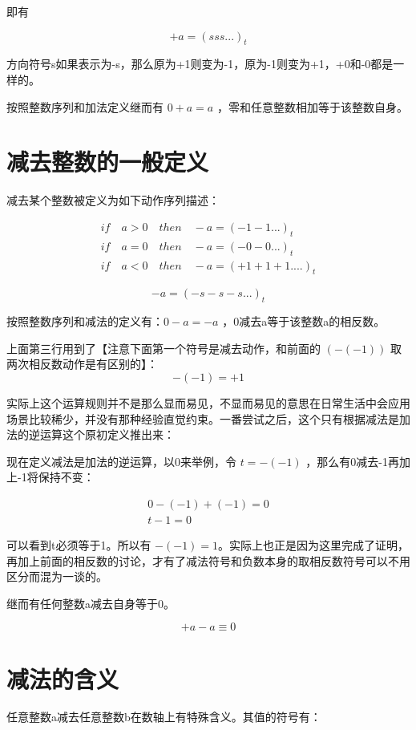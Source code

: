 \documentclass[12pt,oneside]{book}
\begin{document}
即有

\[
+a = (sss...)_t
\]

方向符号s如果表示为-s，那么原为+1则变为-1，原为-1则变为+1，+0和-0都是一样的。

按照整数序列和加法定义继而有 $0+a = a$ ，零和任意整数相加等于该整数自身。


\section{减去整数的一般定义}
减去某个整数被定义为如下动作序列描述：

\begin{align*}
if \quad a>0 \quad then \quad -a=(-1-1...)_t\\
if \quad a=0 \quad then \quad -a=(-0-0...)_t\\
if \quad a<0 \quad then \quad -a=(+1+1+1....)_t
\end{align*}

\[
-a = (-s-s-s...)_t
\]

按照整数序列和减法的定义有：$0-a=-a$  ，0减去a等于该整数a的相反数。

上面第三行用到了【注意下面第一个符号是减去动作，和前面的 $(-(-1))$ 取两次相反数动作是有区别的】：
\begin{equation}
-(-1) = +1
\end{equation}

实际上这个运算规则并不是那么显而易见，不显而易见的意思在日常生活中会应用场景比较稀少，并没有那种经验直觉约束。一番尝试之后，这个只有根据减法是加法的逆运算这个原初定义推出来：

现在定义减法是加法的逆运算，以0来举例，令 $t=-(-1)$ ，那么有0减去-1再加上-1将保持不变：

\begin{align*}
0-(-1)+(-1)=0\\
t-1=0
\end{align*}

可以看到t必须等于1。所以有 $-(-1) = 1$。实际上也正是因为这里完成了证明，再加上前面的相反数的讨论，才有了减法符号和负数本身的取相反数符号可以不用区分而混为一谈的。

继而有任何整数a减去自身等于0。

\begin{equation}
+a -a \equiv 0
\end{equation}


\section{减法的含义}
任意整数a减去任意整数b在数轴上有特殊含义。其值的符号有：
\end{document}
